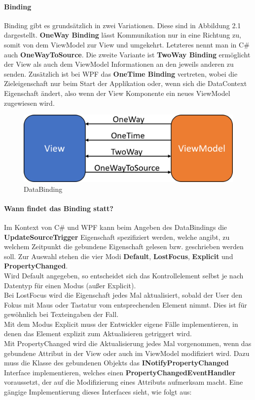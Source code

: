 \documentclass[titlepage=false,12pt]{scrreprt}
\begin{document}
\paragraph{Binding}

Binding gibt es grundsätzlich in zwei Variationen. Diese sind in Abbildung 2.1 dargestellt. \textbf{OneWay Binding}
lässt Kommunikation nur in eine Richtung zu, somit von dem ViewModel zur View und umgekehrt.
Letzteres nennt man in C\# auch \textbf{OneWayToSource}. Die zweite Variante ist \textbf{TwoWay Binding} ermöglicht
der View als auch dem ViewModel Informationen an den jeweils anderen zu senden. Zusätzlich ist 
bei WPF das \textbf{OneTime Binding} vertreten, wobei die Zieleigenschaft nur beim Start der Applikation 
oder, wenn sich die DataContext Eigenschaft ändert, also wenn der View Komponente ein neues 
ViewModel zugewiesen wird.

\begin{figure}[h]
	\includegraphics[width=\textwidth]{Wpf_Binding.png}
	\caption[]{DataBinding}
\end{figure}

\paragraph{Wann findet das Binding statt?}

Im Kontext von C# und WPF kann beim Angeben des DataBindings die \textbf{UpdateSourceTrigger} Eigenschaft spezifiziert werden,
welche angibt, zu welchem Zeitpunkt die gebundene Eigenschaft gelesen bzw. geschrieben werden soll. Zur Auswahl stehen die vier Modi
\textbf{Default}, \textbf{LostFocus}, \textbf{Explicit} und \textbf{PropertyChanged}.\\
Wird Default angegeben, so entscheidet sich das Kontrollelement selbst je nach Datentyp für einen Modus (außer Explicit).\\
Bei LostFocus wird die Eigenschaft jedes Mal aktualisiert, sobald der User den Fokus mit Maus oder Tastatur vom entsprechenden Element nimmt.
Dies ist für gewöhnlich bei Texteingaben der Fall.\\
Mit dem Modus Explicit muss der Entwickler eigene Fälle implementieren, in denen das Element explizit zum Aktualisieren getriggert wird.\\
Mit PropertyChanged wird die Aktualisierung jedes Mal vorgenommen, wenn das gebundene Attribut in der View oder auch im ViewModel modifiziert wird.
Dazu muss die Klasse des gebundenen Objekts das \textbf{INotifyPropertyChanged} Interface implementieren, welches einen \textbf{PropertyChangedEventHandler}
voraussetzt, der auf die Modifizierung eines Attributs aufmerksam macht. Eine gängige Implementierung dieses Interfaces sieht, wie folgt aus:
\end{document}
